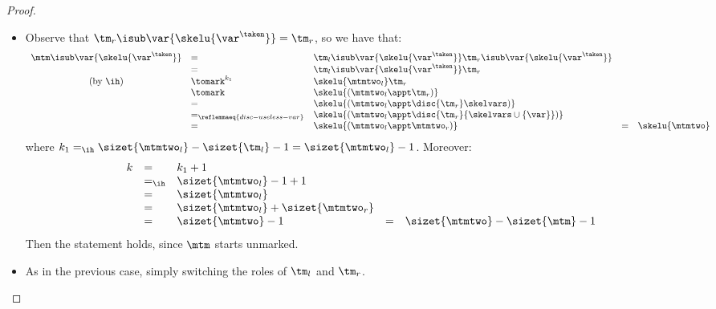 \begin{proof}
\begin{itemize}
\begin{itemize}
\[\begin{array}{lllllll}
& = & \sizet{\mtmtwo} - \sizet{\mtm} -1
\end{array}\]
Then the statement holds, since $\mtm$ starts unmarked.


\item {}
Observe that $\tm_r\isub\var{\skelu{\var^\taken}} = \tm_r$, so we have that:
\[\begin{array}{cllllll}
\mtm\isub\var{\skelu{\var^\taken}} &= &
  \tm_l\isub\var{\skelu{\var^\taken}} \tm_r\isub\var{\skelu{\var^\taken}} 
  \\
  &= &
  \tm_l\isub\var{\skelu{\var^\taken}} \tm_r
  \\
  \mbox{(by \ih)} &\tomark^{k_1} & 
  \skelu{\mtmtwo_l}  \tm_r 
  \\
  &\tomark&
   \skelu{(\mtmtwo_l \appt \tm_r)} 
   \\
  &=&
  \skelu{(\mtmtwo_l\appt\disc{\tm_r}\skelvars)} 
  \\
  &=_{\reflemmaeq{disc-useless-var}}&
  \skelu{(\mtmtwo_l\appt\disc{\tm_r}{\skelvars \cup \{\var\}})} 
  \\
  &=&\skelu{(\mtmtwo_l\appt\mtmtwo_r)} 
   &= &
   \skelu{\mtmtwo}
\end{array}\]
where $k_1 =_{\ih} \sizet{\mtmtwo_l} - \sizet{\tm_l} -1 = \sizet{\mtmtwo_l} -1$. Moreover:
\[\begin{array}{lllllll}
k & = & k_1 + 1
\\
& =_{\ih} & \sizet{\mtmtwo_l} -1 +1
\\
& = & \sizet{\mtmtwo_l}
\\
& = & \sizet{\mtmtwo_l} + \sizet{\mtmtwo_r}
\\
& = & \sizet{\mtmtwo} -1

& = & \sizet{\mtmtwo} - \sizet{\mtm} - 1
\end{array}\]
Then the statement holds, since $\mtm$ starts unmarked.


\item {} As in the previous case, simply switching the roles of $\tm_l$ and $\tm_r$.
\end{itemize}




\end{itemize}
\end{proof}

